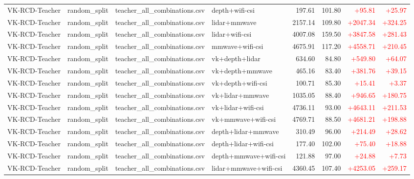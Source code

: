 \documentclass[10pt]{article}
\begin{document}
\begin{longtable}{llllrrrr}
VK-RCD-Teacher & random\_split & teacher\_all\_combinations.csv & depth+wifi-csi & 197.61 & 101.80 & \textcolor{red}{+95.81} & \textcolor{red}{+25.97}\\
VK-RCD-Teacher & random\_split & teacher\_all\_combinations.csv & lidar+mmwave & 2157.14 & 109.80 & \textcolor{red}{+2047.34} & \textcolor{red}{+324.25}\\
VK-RCD-Teacher & random\_split & teacher\_all\_combinations.csv & lidar+wifi-csi & 4007.08 & 159.50 & \textcolor{red}{+3847.58} & \textcolor{red}{+281.43}\\
VK-RCD-Teacher & random\_split & teacher\_all\_combinations.csv & mmwave+wifi-csi & 4675.91 & 117.20 & \textcolor{red}{+4558.71} & \textcolor{red}{+210.45}\\
VK-RCD-Teacher & random\_split & teacher\_all\_combinations.csv & vk+depth+lidar & 634.60 & 84.80 & \textcolor{red}{+549.80} & \textcolor{red}{+64.07}\\
VK-RCD-Teacher & random\_split & teacher\_all\_combinations.csv & vk+depth+mmwave & 465.16 & 83.40 & \textcolor{red}{+381.76} & \textcolor{red}{+39.15}\\
VK-RCD-Teacher & random\_split & teacher\_all\_combinations.csv & vk+depth+wifi-csi & 100.71 & 85.30 & \textcolor{red}{+15.41} & \textcolor{red}{+3.37}\\
VK-RCD-Teacher & random\_split & teacher\_all\_combinations.csv & vk+lidar+mmwave & 1035.05 & 88.40 & \textcolor{red}{+946.65} & \textcolor{red}{+180.75}\\
VK-RCD-Teacher & random\_split & teacher\_all\_combinations.csv & vk+lidar+wifi-csi & 4736.11 & 93.00 & \textcolor{red}{+4643.11} & \textcolor{red}{+211.53}\\
VK-RCD-Teacher & random\_split & teacher\_all\_combinations.csv & vk+mmwave+wifi-csi & 4769.71 & 88.50 & \textcolor{red}{+4681.21} & \textcolor{red}{+198.88}\\
VK-RCD-Teacher & random\_split & teacher\_all\_combinations.csv & depth+lidar+mmwave & 310.49 & 96.00 & \textcolor{red}{+214.49} & \textcolor{red}{+28.62}\\
VK-RCD-Teacher & random\_split & teacher\_all\_combinations.csv & depth+lidar+wifi-csi & 177.40 & 102.00 & \textcolor{red}{+75.40} & \textcolor{red}{+18.88}\\
VK-RCD-Teacher & random\_split & teacher\_all\_combinations.csv & depth+mmwave+wifi-csi & 121.88 & 97.00 & \textcolor{red}{+24.88} & \textcolor{red}{+7.73}\\
VK-RCD-Teacher & random\_split & teacher\_all\_combinations.csv & lidar+mmwave+wifi-csi & 4360.45 & 107.40 & \textcolor{red}{+4253.05} & \textcolor{red}{+259.17}\\

\end{longtable}
\end{document}
